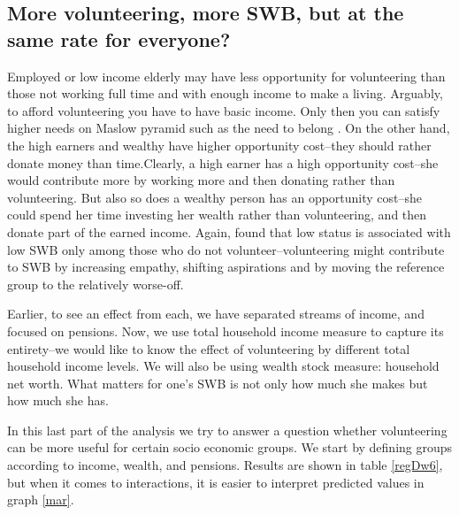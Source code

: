\documentclass[10pt, letterpaper]{article}
\begin{document}
\begin{spacing}{1.4}
\section*{More volunteering, more SWB, but at the same rate for everyone?}

 Employed or low income elderly may have less opportunity for
 volunteering than those not working full time and with enough income to make a
 living. %
%
Arguably, to afford volunteering you have to have basic income. Only then you can
satisfy  higher needs on Maslow pyramid  such as the need to belong
\citep{maslow87}. On the other hand, the high earners and wealthy have higher
opportunity cost--they should rather donate money than time.{Clearly, a
high earner has a high opportunity cost--she would contribute more by working
more and then donating rather than volunteering. But also so does a wealthy
person has an opportunity cost--she could spend her time investing her wealth
rather than volunteering, and then donate part of the earned income.}
%
Again, \citet{borgonovi2008doing} found that low status is associated
with low SWB only among those who do not volunteer--volunteering
might contribute to SWB by increasing empathy, shifting aspirations and by
moving the reference group to the relatively worse-off.

Earlier,  to see an effect from each, we have separated streams of income, and focused on pensions. 
Now, we use total household income measure to capture its entirety--we would
like to know the effect of volunteering by different total household income
levels. We will also be using wealth stock measure: household net worth.
%
What matters for one's SWB is not only how much she makes but how much she has.

In this last part of the analysis we try to answer a question whether
volunteering can be more useful for certain socio economic groups. %
 We start by defining groups according to income, wealth, and pensions.  
 Results are shown in table \ref{regDw6}, but when it comes to interactions, it
 is  easier to interpret predicted values in graph \ref{mar}.


\end{spacing}
\end{document}
